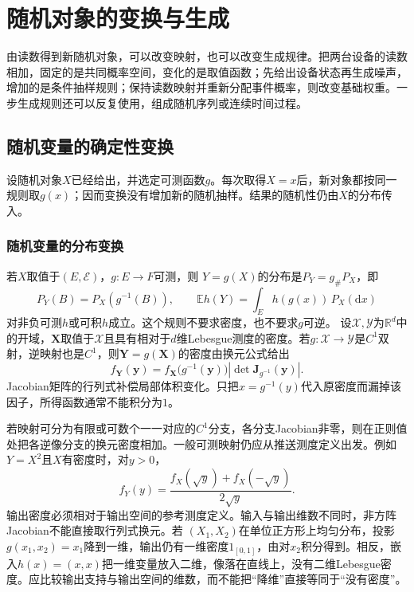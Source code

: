 \section{随机对象的变换与生成}
\label{sec:rv-transformations}
\label{sec:probability-random-vectors-transformations}
由读数得到新随机对象，可以改变映射，也可以改变生成规律。把两台设备的读数相加，固定的是共同概率空间，变化的是取值函数；先给出设备状态再生成噪声，增加的是条件抽样规则；保持读数映射并重新分配事件概率，则改变基础权重。一步生成规则还可以反复使用，组成随机序列或连续时间过程。

\subsection{随机变量的确定性变换}
设随机对象\(X\)已经给出，并选定可测函数\(g\)。每次取得\(X=x\)后，新对象都按同一规则取\(g(x)\)；因而变换没有增加新的随机抽样。结果的随机性仍由\(X\)的分布传入。

\subsubsection{随机变量的分布变换}
\label{sec:rv-pushforward}
若\(X\)取值于\((E,\mathcal E)\)，\(g:E\to F\)可测，则
\(Y=g(X)\)的分布是\(P_Y=g_\#P_X\)，即
\[
P_Y(B)=P_X(g^{-1}(B)),\qquad
\mathbb E h(Y)=\int_E h(g(x))\,P_X(\mathrm dx)
\]
对非负可测\(h\)或可积\(h\)成立。这个规则不要求密度，也不要求\(g\)可逆。
设\(\mathcal X,\mathcal Y\)为\(\mathbb R^d\)中的开域，\(\bm X\)取值于\(\mathcal X\)且具有相对于\(d\)维Lebesgue测度的密度。若\(g:\mathcal X\to\mathcal Y\)是\(C^1\)双射，逆映射也是\(C^1\)，则\(\bm Y=g(\bm X)\)的密度由换元公式给出
\begin{equation}
  f_{\bm{Y}}(\bm{y})
  =
  f_{\bm{X}}\bigl(g^{-1}(\bm{y})\bigr)
  \left|
    \det\bm{J}_{g^{-1}}(\bm{y})
  \right|.
  \label{eq:probability-density-change-variables}
\end{equation}
Jacobian矩阵的行列式补偿局部体积变化。只把\(x=g^{-1}(y)\)代入原密度而漏掉该因子，所得函数通常不能积分为\(1\)。

若映射可分为有限或可数个一一对应的\(C^1\)分支，各分支Jacobian非零，则在正则值处把各逆像分支的换元密度相加。一般可测映射仍应从推送测度定义出发。例如\(Y=X^2\)且\(X\)有密度时，对\(y>0\)，
\[ f_Y(y)
  =\frac{f_X(\sqrt{y})+f_X(-\sqrt{y})}{2\sqrt{y}}. \]
输出密度必须相对于输出空间的参考测度定义。输入与输出维数不同时，非方阵Jacobian不能直接取行列式换元。若
\((X_1,X_2)\)在单位正方形上均匀分布，投影\(g(x_1,x_2)=x_1\)降到一维，输出仍有一维密度\(1_{[0,1]}\)，由对\(x_2\)积分得到。相反，嵌入\(h(x)=(x,x)\)把一维变量放入二维，像落在直线上，没有二维Lebesgue密度。应比较输出支持与输出空间的维数，而不能把“降维”直接等同于“没有密度”。

